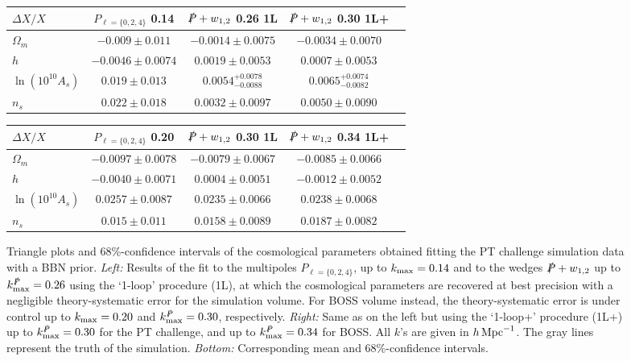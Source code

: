 \documentclass[12pt,a4paper]{article}
\def\hinvMpc{h\,{\rm Mpc}^{-1}}
\def\PA{\slashed{P}}
\renewcommand{\(}{\left(}
\renewcommand{\)}{\right)}
\begin{document}
{\begin{figure}[ht!]
\scriptsize
    \begin{tabular}{|l|c|c|c|c|}
     \hline 
    $\Delta X / X$ & $P_{\ell=\{0,2,4\}}$ 0.14 			&  $\PA +  w_{1,2}$ 0.26 1L 		&  $\PA +  w_{1,2}$ 0.30 1L+ \\ \hline 
    $\Omega_{m }$ & $-0.009\pm 0.011$ 		& $-0.0014\pm 0.0075$ 			& $-0.0034\pm 0.0070$ \\ 
    $ h$ & $-0.0046\pm 0.0074$  			& $0.0019\pm 0.0053$ 			& $0.0007\pm 0.0053$ \\ 
    $\ln (10^{10}A_s)$ & $0.019\pm 0.013$  	& $0.0054^{+0.0078}_{-0.0088}$ 	& $0.0065^{+0.0074}_{-0.0082}$ \\ 
    $ n_s$ & $0.022\pm 0.018$ 				& $0.0032\pm 0.0097$			& $0.0050\pm 0.0090$ \\
    \hline 
    \end{tabular}
    \begin{tabular}{|l|c|c|c|c|}
     \hline 
    $\Delta X / X$ & $P_{\ell=\{0,2,4\}}$ 0.20 			& $\PA +  w_{1,2}$ 0.30 1L 		&  $\PA +  w_{1,2}$ 0.34 1L+ \\ \hline 
    $\Omega_{m }$ & $-0.0097\pm 0.0078$ 	& $-0.0079\pm 0.0067$ 			& $-0.0085\pm 0.0066$ \\ 
    $ h$ & $-0.0040\pm 0.0071$  			& $0.0004\pm 0.0051$ 			& $-0.0012\pm 0.0052$ \\ 
    $\ln (10^{10}A_s)$ & $0.0257\pm 0.0087$  	& $0.0235\pm 0.0066$ 			& $0.0238\pm 0.0068$ \\ 
    $ n_s$ & $0.015\pm 0.011$				& $0.0158\pm 0.0089$			& $0.0187\pm 0.0082$ \\
    \hline 
    \end{tabular}
\caption{\small Triangle plots and 68\%-confidence intervals of the cosmological parameters obtained fitting the PT challenge simulation data with a BBN prior. 
{\it Left:} Results of the fit to the multipoles $P_{\ell=\{0,2,4\}}$, up to $k_{\rm max} = 0.14$ and to the wedges $\PA + w_{1,2}$ up to $k_{\rm max}^{\PA} = 0.26$ using the `1-loop' procedure (1L), at which the cosmological parameters are recovered at best precision with a negligible theory-systematic error for the simulation volume. 
For BOSS volume instead, the theory-systematic error is under control up to $k_{\rm max} = 0.20$ and $k_{\rm max}^{\PA} = 0.30$, respectively. 
{\it Right:} Same as on the left but using the `1-loop+' procedure (1L+) up to $k_{\rm max}^{\PA} = 0.30$ for the PT challenge, and up to $k_{\rm max}^{\PA} = 0.34$ for BOSS. 
All $k$'s are given in $\hinvMpc$. 
The gray lines represent the truth of the simulation. 
{\it Bottom: } Corresponding mean and $68\%$-confidence intervals. 
} \label{fig:pt} 
\end{figure}

}
\end{document}
